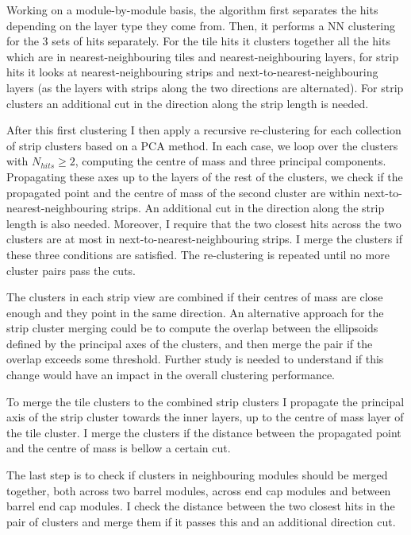 Working on a module-by-module basis, the algorithm first separates the hits depending on the layer type they come from. Then, it performs a NN clustering for the 3 sets of hits separately. For the tile hits it clusters together all the hits which are in nearest-neighbouring tiles and nearest-neighbouring layers, for strip hits it looks at nearest-neighbouring strips and next-to-nearest-neighbouring layers (as the layers with strips along the two directions are alternated). For strip clusters an additional cut in the direction along the strip length is needed.

After this first clustering I then apply a recursive re-clustering for each collection of strip clusters based on a PCA method. In each case, we loop over the clusters with $N_{hits}\geq2$, computing the centre of mass and three principal components. Propagating these axes up to the layers of the rest of the clusters, we check if the propagated point and the centre of mass of the second cluster are within next-to-nearest-neighbouring strips. An additional cut in the direction along the strip length is also needed. Moreover, I require that the two closest hits across the two clusters are at most in next-to-nearest-neighbouring strips. I merge the clusters if these three conditions are satisfied. The re-clustering is repeated until no more cluster pairs pass the cuts.

The clusters in each strip view are combined if their centres of mass are close enough and they point in the same direction. An alternative approach for the strip cluster merging could be to compute the overlap between the ellipsoids defined by the principal axes of the clusters, and then merge the pair if the overlap exceeds some threshold. Further study is needed to understand if this change would have an impact in the overall clustering performance.

To merge the tile clusters to the combined strip clusters I propagate the principal axis of the strip cluster towards the inner layers, up to the centre of mass layer of the tile cluster. I merge the clusters if the distance between the propagated point and the centre of mass is bellow a certain cut.

The last step is to check if clusters in neighbouring modules should be merged together, both across two barrel modules, across end cap modules and between barrel end cap modules. I check the distance between the two closest hits in the pair of clusters and merge them if it passes this and an additional direction cut.


